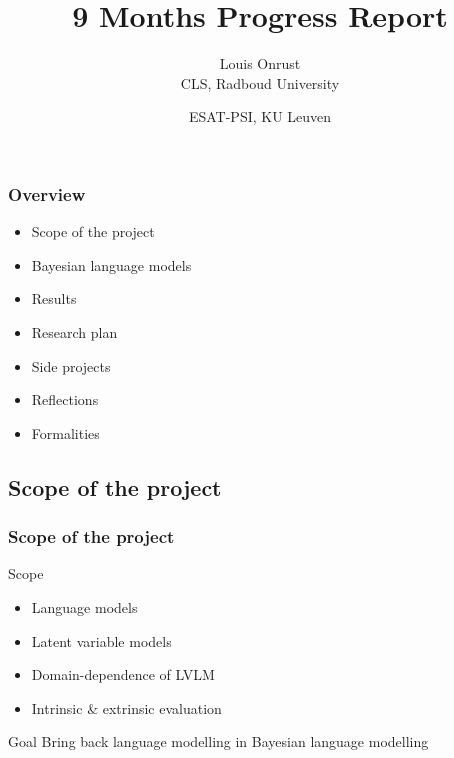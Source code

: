 \documentclass{beamer}
\title{9 Months Progress Report}
\author{Louis Onrust \\ CLS, Radboud University \and ESAT-PSI, KU Leuven}
\begin{document}
\begin{frame}
    \titlepage
\end{frame}

\begin{frame}
    \frametitle{Overview}

    \begin{itemize}
        \item Scope of the project
        \item Bayesian language models
        \item Results
        \item Research plan
        \item Side projects
        \item Reflections
        \item Formalities
    \end{itemize}

\end{frame}

\begin{frame}\section{Scope of the project}
    \frametitle{Scope of the project}

    \begin{block}{Scope}
        \begin{itemize}
            \item Language models
            \item Latent variable models
            \item Domain-dependence of LVLM
            \item Intrinsic \& extrinsic evaluation
        \end{itemize}
    \end{block}

    \begin{block}{Goal}
        Bring back language modelling in Bayesian language modelling    
    \end{block}
\end{frame}

%
%    
%
%
\end{document}

